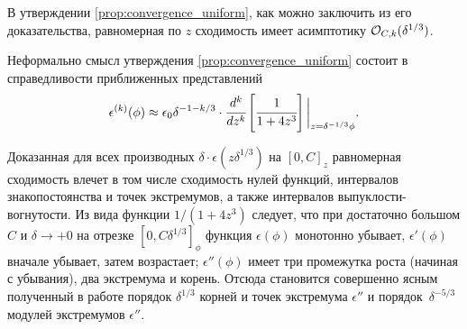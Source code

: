 \begin{remark}
	В утверждении \ref{prop:convergence_uniform}, как можно заключить из его доказательства, равномерная по $z$ сходимость имеет асимптотику ${\mathcal{O}}_{C, k}(\delta^{1/3})$.
\end{remark}

Неформально смысл утверждения \ref{prop:convergence_uniform} состоит в справедливости приближенных представлений
\[
	\epsilon^{(k)}(\phi) \approx \epsilon_0 \delta^{-1 - k / 3} \cdot \cfrac{d^k}{d z^k} \left[ \cfrac{1}{1 + 4 z^3} \right] \bigg|_{z = \delta^{-1/3} \phi}.
\]

Доказанная для всех производных $\delta \cdot \epsilon(z \delta^{1/3})$ на $[0, C]_z$ равномерная сходимость влечет в том числе сходимость нулей функций, интервалов знакопостоянства и точек экстремумов, а также интервалов выпуклости-вогнутости. Из вида функции $1 / (1 + 4z^3)$ следует, что при достаточно большом $C$ и $\delta \to +0$ на отрезке $[0, C \delta^{1/3}]_\phi$ функция $\epsilon(\phi)$ монотонно убывает, $\epsilon'(\phi)$ вначале убывает, затем возрастает; $\epsilon''(\phi)$ имеет три промежутка роста (начиная с убывания), два экстремума и корень. Отсюда становится совершенно ясным полученный в работе \cite{ponomarev_stability} порядок $\delta^{1/3}$ корней и точек экстремума $\epsilon''$ и порядок~$\delta^{-5/3}$ модулей экстремумов $\epsilon''$.

